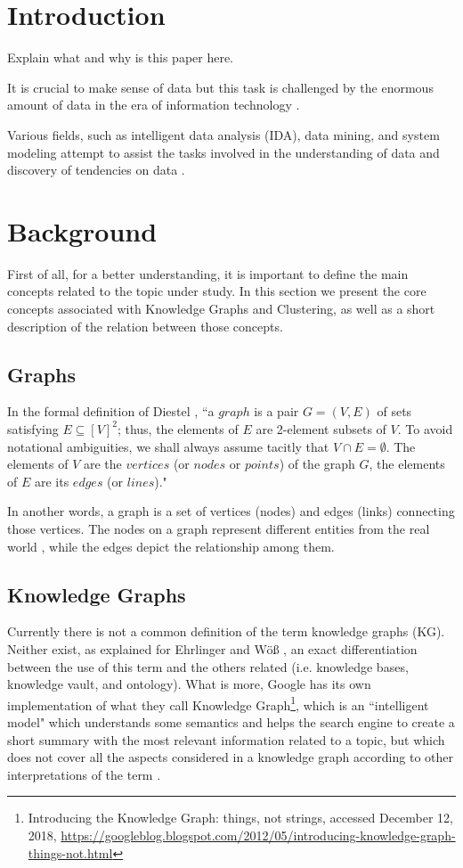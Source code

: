 \documentclass[runningheads]{llncs}
\begin{document}
\section{Introduction}
Explain what and why is this paper here.

It is crucial to make sense of data but this task is challenged by the enormous amount of data in the era of information technology \cite{Pedrycz}.

Various fields, such as intelligent data analysis (IDA), data mining, and system modeling attempt to assist the tasks involved in the understanding of data and discovery of tendencies on data \cite{Pedrycz}.


\section{Background}
First of all, for a better understanding, it is important to define the main concepts related to the topic under study. In this section we present the core concepts associated with Knowledge Graphs and Clustering, as well as a short description of the relation between those concepts.


\subsection{Graphs}
In the formal definition of Diestel \cite{Diestel}, ``a $graph$ is a pair $G = (V, E)$ of sets satisfying $E \subseteq [V]^2$; thus, the elements of $E$ are 2-element subsets of $V$. To avoid notational ambiguities, we shall always assume tacitly that $V \cap E = \emptyset$. The elements of $V$ are the $vertices$ (or $nodes$ or $points$) of the graph $G$, the elements of $E$ are its $edges$ (or $lines$)."

In another words, a graph is a set of vertices (nodes) and edges (links) connecting those vertices. The nodes on a graph represent different entities from the real world \cite{Robinson}, while the edges depict the relationship among them.

\subsection{Knowledge Graphs}
Currently there is not a common definition of the term knowledge graphs (KG). Neither exist, as explained for Ehrlinger and W{\"o}{\ss} \cite{Ehrlinger}, an exact differentiation between the use of this term and the others related (i.e. knowledge bases, knowledge vault, and ontology). What is more, Google has its own implementation of what they call Knowledge Graph\footnote{Introducing the Knowledge Graph: things, not strings, accessed December 12, 2018,  \href{https://googleblog.blogspot.com/2012/05/introducing-knowledge-graph-things-not.html}{https://googleblog.blogspot.com/2012/05/introducing-knowledge-graph-things-not.html}}, which is an ``intelligent model" which understands some semantics and helps the search engine to create a short summary with the most relevant information related to a topic, but which does not cover all the aspects considered in a knowledge graph according to other interpretations of the term \cite{Ehrlinger}.
\end{document}
